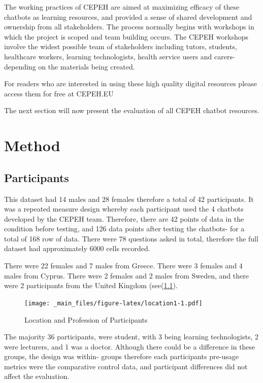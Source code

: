 \documentclass[a4paper, nobind]{templates/ociamthesis}
\begin{document}
The working practices of CEPEH are aimed at maximizing efficacy of these chatbots as learning resources, and provided a sense of shared development and ownership from all stakeholders.
The process normally begins with workshops in which the project is scoped and team building occurs.
The CEPEH workshops involve the widest possible team of stakeholders including tutors, students, healthcare workers, learning technologists, health service users and carers- depending on the materials being created.

For readers who are interested in using these high quality digital resources please access them for free at CEPEH.EU

The next section will now present the evaluation of all CEPEH chatbot resources.

\hypertarget{method}{%
\chapter{Method}\label{method}}

\minitoc 

\hypertarget{participants}{%
\section{Participants}\label{participants}}

This dataset had 14 males and 28 females therefore a total of 42 participants.
It was a repeated measure design whereby each participant used the 4 chatbots developed by the CEPEH team.
Therefore, there are 42 points of data in the condition before testing, and 126 data points after testing the chatbots- for a total of 168 row of data.
There were 78 questions asked in total, therefore the full dataset had approximately 6000 cells recorded.

There were 22 females and 7 males from Greece.
There were 3 females and 4 males from Cyprus.
There were 2 females and 2 males from Sweden,
and there were 2 participants from the United Kingdom (see(\ref{fig:location1}).

\begin{figure}
\centering
\texttt{[image: \_main\_files/figure-latex/location1-1.pdf]}
\caption{\label{fig:location1}Location and Profession of Participants}
\end{figure}

The majority 36 participants, were student, with 3 being learning technologists, 2 were lecturers, and 1 was a doctor.
Although there could be a difference in these groups, the design was within- groups therefore each participants pre-usage metrics were the comparative control data, and participant differences did not affect the evaluation.
\end{document}
